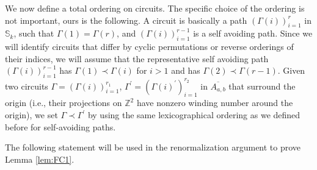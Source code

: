\documentclass[12pt, twoside,a4paper,reqno]{amsart}
\theoremstyle{plain}
\theoremstyle{remark}
\theoremstyle{definition}
\newcommand{\ol}{\overline}
\begin{document}
We now define a total ordering on circuits. The specific choice of the ordering is not important, ours is the following. A circuit is basically a path $\left( \Gamma(i)\right) _{i=1}^{r}$ in $\mathbb{S}_{k}$, such that $\Gamma(1)=\Gamma(r)$, and $\left( \Gamma (i)\right) _{i=1}^{r-1}$ is a self avoiding path.
Since we will identify circuits that differ by cyclic permutations or reverse orderings of their indices,
we will assume that the representative self avoiding path $(\Gamma(i)) _{i=1}^{r-1}$ has $\Gamma(1) \prec \Gamma(i)$
for $i >1$ and has $\Gamma(2) \prec \Gamma(r-1)$.
Given two circuits $\Gamma =\left( \Gamma (i)\right) _{i=1}^{r_{1}}$, $%
\Gamma ^{\prime }=\left( \Gamma (i)^{\prime }\right) _{i=1}^{r_{2}}$ in $%
\ol{A_{a,b}}$ that surround the origin (i.e., their
projections on $\mathbb{Z}^{2}$ have nonzero winding number around the origin), we set $\Gamma \prec
\Gamma ^{\prime }$ by using the same lexicographical ordering as we defined before for self-avoiding paths.

The following statement will be used in the renormalization argument to prove Lemma
\ref{lem:FC1}.
\end{document}
